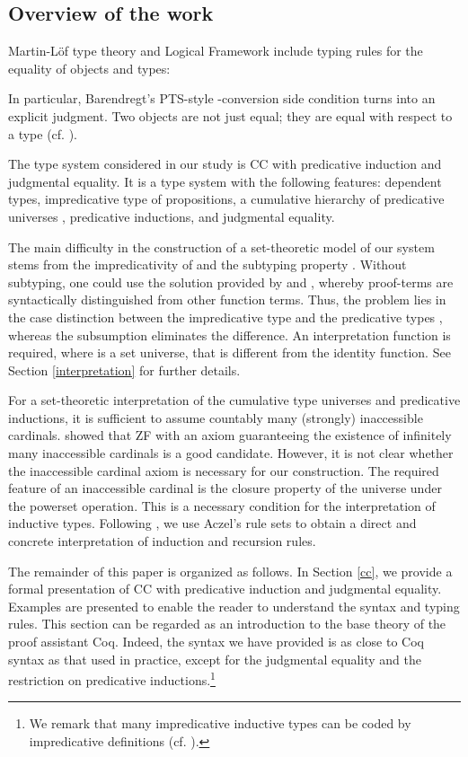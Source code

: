 \documentclass{LMCS}
\theoremstyle{plain}
\theoremstyle{definition}
\begin{document}
\subsection*{Overview of the work}
Martin-L\"of type theory and Logical Framework include typing rules for the equality of objects and types:\medskip

In particular, Barendregt's PTS-style -conversion side condition
turns into an explicit judgment. Two objects are not just equal; they are equal with respect to a type (cf. \cite{nordstroem,goguen-phd,aczel-relating}).

The type system considered in our study is CC with predicative induction and judgmental equality. It is a type system with the following features: dependent types, impredicative type  of propositions, a cumulative hierarchy of predicative universes , predicative inductions, and judgmental equality.

The main difficulty in the construction of a set-theoretic model of our system stems from the impredicativity of  and the subtyping property . Without subtyping, one could use the solution provided by \cite{miwe} and \cite{werner-proof}, whereby proof-terms are syntactically distinguished from other function terms. Thus, the problem lies in the case distinction between the impredicative type  and the predicative types , whereas the subsumption eliminates the difference. An interpretation function  is required, where  is a set universe, that is different from the identity function. See Section \ref{interpretation} for further details.

For a set-theoretic interpretation of the cumulative type universes and predicative inductions, it is sufficient to assume countably many (strongly) inaccessible cardinals. \cite{werner-set} showed that ZF with an axiom guaranteeing the existence of infinitely many inaccessible cardinals is a good candidate. However, it is not clear whether the inaccessible cardinal axiom is necessary for our construction. The required feature of an inaccessible cardinal  is the closure property of the universe  under the powerset operation. This is a necessary condition for the interpretation of inductive types. Following \cite{dybjer}, we use Aczel's rule sets to obtain a direct and concrete interpretation of induction and recursion rules.

The remainder of this paper is organized as follows. In Section \ref{cc}, we provide a formal presentation of CC with predicative induction and judgmental equality. Examples are presented to enable the reader to understand the syntax and typing rules. This section can be regarded as an introduction to the base theory of the proof assistant Coq. Indeed, the syntax we have provided is as close to Coq syntax as that used in practice, except for the judgmental equality and the restriction on predicative inductions.\footnote{We remark that many impredicative inductive types can be coded by impredicative definitions (cf. \cite{girard-proofs,coquand-meta,werner-set}).}
\end{document}
